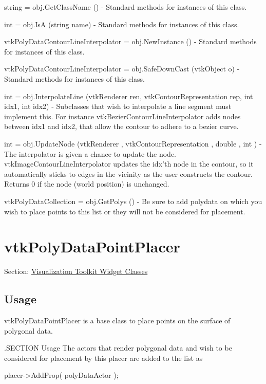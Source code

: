 \begin{DoxyItemize}
\item {\ttfamily string = obj.\-Get\-Class\-Name ()} -\/ Standard methods for instances of this class.  
\item {\ttfamily int = obj.\-Is\-A (string name)} -\/ Standard methods for instances of this class.  
\item {\ttfamily vtk\-Poly\-Data\-Contour\-Line\-Interpolator = obj.\-New\-Instance ()} -\/ Standard methods for instances of this class.  
\item {\ttfamily vtk\-Poly\-Data\-Contour\-Line\-Interpolator = obj.\-Safe\-Down\-Cast (vtk\-Object o)} -\/ Standard methods for instances of this class.  
\item {\ttfamily int = obj.\-Interpolate\-Line (vtk\-Renderer ren, vtk\-Contour\-Representation rep, int idx1, int idx2)} -\/ Subclasses that wish to interpolate a line segment must implement this. For instance vtk\-Bezier\-Contour\-Line\-Interpolator adds nodes between idx1 and idx2, that allow the contour to adhere to a bezier curve.  
\item {\ttfamily int = obj.\-Update\-Node (vtk\-Renderer , vtk\-Contour\-Representation , double , int )} -\/ The interpolator is given a chance to update the node. vtk\-Image\-Contour\-Line\-Interpolator updates the idx'th node in the contour, so it automatically sticks to edges in the vicinity as the user constructs the contour. Returns 0 if the node (world position) is unchanged.  
\item {\ttfamily vtk\-Poly\-Data\-Collection = obj.\-Get\-Polys ()} -\/ Be sure to add polydata on which you wish to place points to this list or they will not be considered for placement.  
\end{DoxyItemize}\hypertarget{vtkwidgets_vtkpolydatapointplacer}{}\section{vtk\-Poly\-Data\-Point\-Placer}\label{vtkwidgets_vtkpolydatapointplacer}
Section\-: \hyperlink{sec_vtkwidgets}{Visualization Toolkit Widget Classes} \hypertarget{vtkwidgets_vtkxyplotwidget_Usage}{}\subsection{Usage}\label{vtkwidgets_vtkxyplotwidget_Usage}
vtk\-Poly\-Data\-Point\-Placer is a base class to place points on the surface of polygonal data.

.S\-E\-C\-T\-I\-O\-N Usage The actors that render polygonal data and wish to be considered for placement by this placer are added to the list as \begin{DoxyVerb} placer->AddProp( polyDataActor );\end{DoxyVerb}


